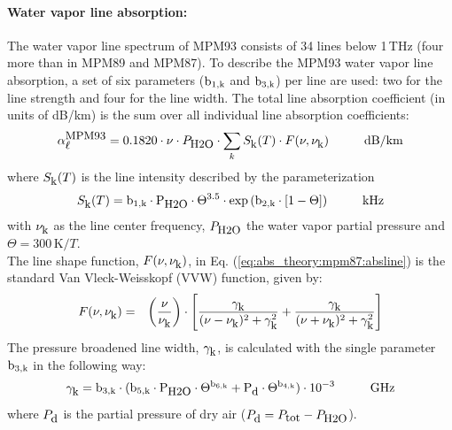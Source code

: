 \paragraph{Water vapor line absorption:}
\label{levele:mpm93_h2olines}
The water vapor line spectrum of MPM93 \citep{liebeetal:93} 
consists of 34 lines below 1\,THz (four more than in MPM89 and MPM87). 
To describe the MPM93 water vapor line absorption, a set of six parameters 
($\rm b_{\rm 1,k}$ and $\rm b_{\rm 3,k}$) per line are used: two for the line strength and 
four for the line width. The total line absorption coefficient 
(in units of dB/km) is the sum over all individual line absorption 
coefficients:
\begin{equation}
  \label{eq:abs_theory:mpm93:absline}
  \alphampmnl = 0.1820 \cdot \nu \cdot \phzo \cdot 
  \sum_{k}{\inten \cdot \shape}\hspace*{10mm}\mbox{dB/km}
\end{equation}
where $S_{\mbox{\rm \small k}}(T)$ is the line intensity described by the parameterization
\begin{equation}
  \label{eq:abs_theory:mpm93:strength}
  \inten = \bek \cdot \phzo \cdot \Theta^{3.5} 
           \cdot \exp{(\bzk \cdot [1-\Theta])}\hspace*{10mm}\mbox{kHz}
\end{equation}
with $\nu_{\mbox{\rm \small k}}$ as the line center frequency, $P_{\mbox{\rm \small H2O}}$ the water
vapor partial pressure and $\Theta = 300\,\mbox{K}/T$.\\
The line shape function, $F(\nu,\nu_{\mbox{\rm \small k}})$, in Eq. (\ref{eq:abs_theory:mpm87:absline}) 
is the standard Van Vleck-Weisskopf (VVW) function, given by:
\begin{eqnarray}
  \label{eq:abs_theory:mpm93:VVW}
  F(\nu,\nu_{\mbox{\rm \small k}}) & = & \left(\frac{\nu}{\nu_{\mbox{\rm \small k}}}\right) \cdot 
               \left[\frac{\gamma_{\mbox{\rm \small k}}}{(\nu - \nu_{\mbox{\rm \small k}})^2 + \gamma_{\mbox{\rm \small k}}^2} + 
                     \frac{\gamma_{\mbox{\rm \small k}}}{(\nu + \nu_{\mbox{\rm \small k}})^2 + \gamma_{\mbox{\rm \small k}}^2}\right]\\
\end{eqnarray}
The pressure broadened line width, $\gamma_{\mbox{\rm \small k}}$, is calculated with the 
single parameter $\rm b_{\rm 3,k}$ in the following way:
\begin{equation}
  \label{eq:abs_theory:mpm93:gamma}
  \gamk = \bdk \cdot 
         (\bfk \cdot \phzo \cdot \Theta^{\bsk} +
                     \pda  \cdot \Theta^{\bvk})
        \cdot 10^{-3}\hspace*{10mm}\mbox{GHz}
\end{equation}
where $P_{\mbox{\rm \small d}}$ is the partial pressure of dry air ($P_{\mbox{\rm \small d}}=P_{\mbox{\rm \small tot}}-P_{\mbox{\rm \small H2O}}$). 

